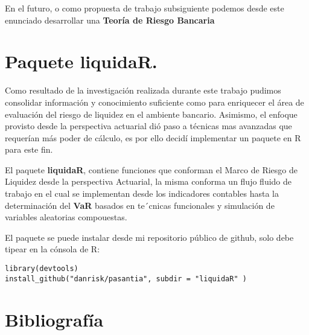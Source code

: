 \documentclass[]{article}
\begin{document}
En el futuro, o como propuesta de trabajo subsiguiente podemos desde
este enunciado desarrollar una \textbf{Teoría de Riesgo Bancaria}

\hypertarget{paquete-liquidar.}{%
\section{\texorpdfstring{Paquete
\textbf{liquidaR}.}{Paquete liquidaR.}}\label{paquete-liquidar.}}

Como resultado de la investigación realizada durante este trabajo
pudimos consolidar información y conocimiento suficiente como para
enriquecer el área de evaluación del riesgo de liquidez en el ambiente
bancario. Asimismo, el enfoque provisto desde la perspectiva actuarial
dió paso a técnicas mas avanzadas que requerían más poder de cálculo, es
por ello decidí implementar un paquete en R para este fin.

El paquete \textbf{liquidaR}, contiene funciones que conforman el Marco
de Riesgo de Liquidez desde la perspectiva Actuarial, la misma conforma
un flujo fluido de trabajo en el cual se implementan desde los
indicadores contables hasta la determinación del \textbf{VaR} basados en
te´cnicas funcionales y simulación de variables aleatorias compouestas.

El paquete se puede instalar desde mi repositorio público de github,
solo debe tipear en la cónsola de R:

\begin{verbatim}
library(devtools)
install_github("danrisk/pasantia", subdir = "liquidaR" )
\end{verbatim}

\hypertarget{bibliografia}{%
\section{Bibliografía}\label{bibliografia}}
\end{document}
